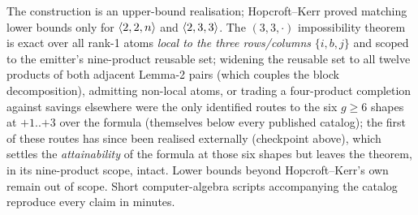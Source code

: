 The construction is an upper-bound realisation; Hopcroft--Kerr proved
matching lower bounds only for \(\langle 2, 2, n \rangle\) and
\(\langle 2, 3, 3 \rangle\). The \((3,3,\cdot)\) impossibility theorem is exact
over all rank-1 atoms \emph{local to the three rows/columns} \(\{i,b,j\}\)
and scoped to the emitter's nine-product reusable set; widening the
reusable set to all twelve products of both adjacent Lemma-2 pairs (which
couples the block decomposition), admitting non-local atoms, or trading a
four-product completion against savings elsewhere were the only identified
routes to the six \(g \ge 6\) shapes at \(+1\)..\(+3\) over the formula
(themselves below every published catalog); the first of these routes has
since been realised externally (checkpoint above), which settles the
\emph{attainability} of the formula at those six shapes but leaves the
theorem, in its nine-product scope, intact. Lower bounds beyond
Hopcroft--Kerr's own remain out of scope. Short
computer-algebra scripts accompanying the catalog reproduce every claim in
minutes.
